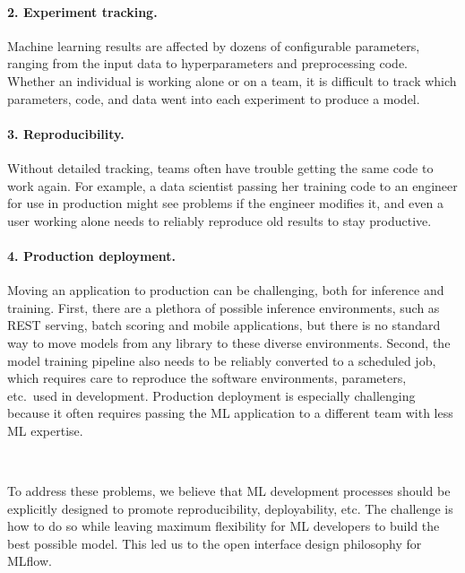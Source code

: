 \documentclass[11pt]{article}
\begin{document}
\vspace{-0.6em}
\paragraph{2. Experiment tracking.} Machine learning results are affected by dozens of configurable parameters, ranging from the input data to hyperparameters and preprocessing code. Whether an individual is working alone or on a team, it is difficult to track which parameters, code, and data went into each experiment to produce a model.

\vspace{-0.6em}
\paragraph{3. Reproducibility.} Without detailed tracking, teams often have trouble getting the same code to work again. For example, a data scientist passing her training code to an engineer for use in production might see problems if the engineer modifies it, and even a user working alone needs to reliably reproduce old results to stay productive. %

\vspace{-0.6em}
\paragraph{4. Production deployment.} Moving an application to production can be challenging, both for inference and training. First, there are a plethora of possible inference environments, such as REST serving, batch scoring and mobile applications, but there is no standard way to move models from any library to these diverse environments. Second, the model training pipeline also needs to be reliably converted to a scheduled job, which requires care to reproduce the software environments, parameters, etc.~used in development.
Production deployment is especially challenging because it often requires passing the ML application to a different team with less ML expertise.

~

\vspace{-0.6em}
To address these problems, we believe that ML development processes should be explicitly designed to promote reproducibility, deployability, etc. The challenge is how to do so while leaving maximum flexibility for ML developers to build the best possible model. This led us to the open interface design philosophy for MLflow.
\end{document}
